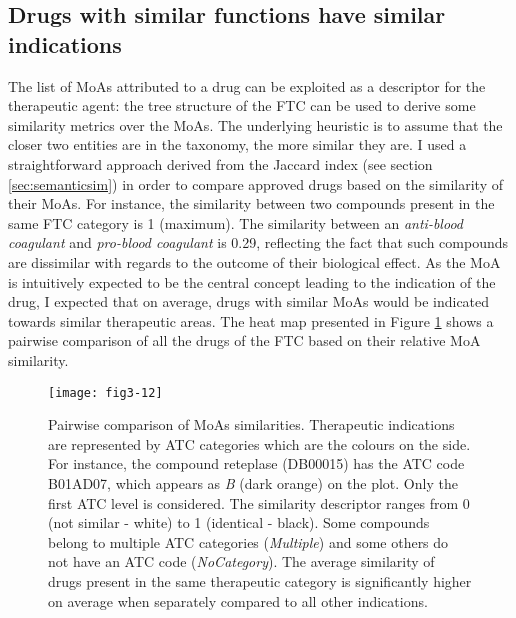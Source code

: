 \subsection{Drugs with similar functions have similar indications}
\label{sec:simf}
The list of MoAs attributed to a drug can be exploited as a descriptor for the therapeutic agent: the tree structure of the FTC can be used to derive some similarity metrics over the MoAs. The underlying heuristic is to assume that the closer two entities are in the taxonomy, the more similar they are. I used a straightforward approach derived from the Jaccard index (see section \ref{sec:semanticsim}) in order to compare approved drugs based on the similarity of their MoAs. For instance, the similarity between two compounds present in the same FTC category is 1 (maximum). The similarity between an \emph{anti-blood coagulant} and \emph{pro-blood coagulant} is 0.29, reflecting the fact that such compounds are dissimilar with regards to the outcome of their biological effect. As the MoA is intuitively expected to be the central concept leading to the indication of the drug, I expected that on average, drugs with similar MoAs would be indicated towards similar therapeutic areas.
The heat map presented in Figure \ref{fig3-12} shows a pairwise comparison of all the drugs of the FTC based on their relative MoA similarity.

\begin{figure}[H]
    \centering
    \texttt{[image: fig3-12]}
    \caption{Pairwise comparison of MoAs similarities. Therapeutic indications are represented by ATC categories which are the colours on the side. For instance, the compound reteplase (DB00015) has the ATC code B01AD07, 
which appears as \emph{B} (dark orange) on the plot. Only the first ATC level is considered. The similarity descriptor ranges from 0 (not similar - white) to 1 (identical - black). Some compounds belong to multiple ATC categories (\emph{Multiple}) and some others do not have an ATC code (\emph{NoCategory}). The average similarity of drugs present in the same therapeutic category is significantly higher on average when separately compared to all other indications.}
    \label{fig3-12}
\end{figure}

